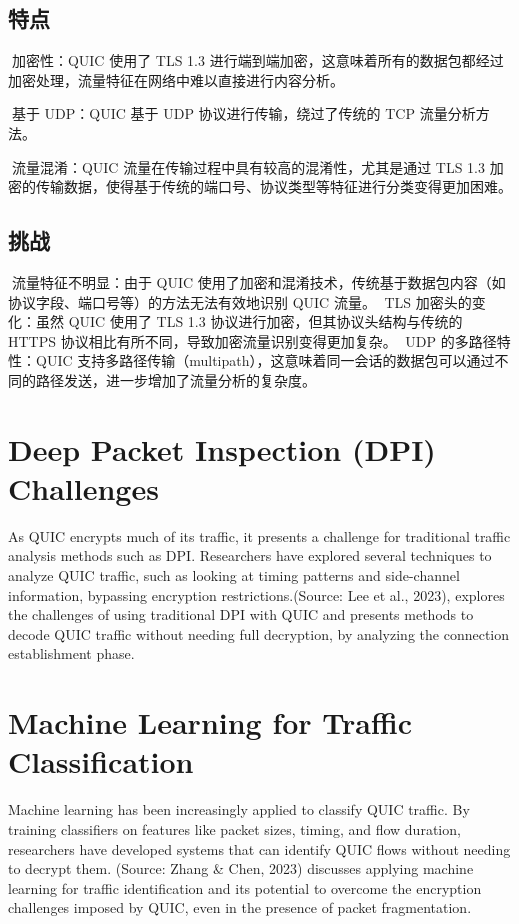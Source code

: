 \documentclass[a4paper, 10pt]{article}
\begin{document}
\subsection{特点}

加密性：QUIC 使用了 TLS 1.3 进行端到端加密，这意味着所有的数据包都经过加密处理，流量特征在网络中难以直接进行内容分析。

基于 UDP：QUIC 基于 UDP 协议进行传输，绕过了传统的 TCP 流量分析方法。

流量混淆：QUIC 流量在传输过程中具有较高的混淆性，尤其是通过 TLS 1.3 加密的传输数据，使得基于传统的端口号、协议类型等特征进行分类变得更加困难。

\subsection{挑战}

流量特征不明显：由于 QUIC 使用了加密和混淆技术，传统基于数据包内容（如协议字段、端口号等）的方法无法有效地识别 QUIC 流量。
TLS 加密头的变化：虽然 QUIC 使用了 TLS 1.3 协议进行加密，但其协议头结构与传统的 HTTPS 协议相比有所不同，导致加密流量识别变得更加复杂。
UDP 的多路径特性：QUIC 支持多路径传输（multipath），这意味着同一会话的数据包可以通过不同的路径发送，进一步增加了流量分析的复杂度。








\section{Deep Packet Inspection (DPI) Challenges}

As QUIC encrypts much of its traffic, it presents a challenge for traditional traffic analysis methods such as DPI. Researchers have explored several techniques to analyze QUIC traffic, such as looking at timing patterns and side-channel information, bypassing encryption restrictions.(Source: Lee et al., 2023), explores the challenges of using traditional DPI with QUIC and presents methods to decode QUIC traffic without needing full decryption, by analyzing the connection establishment phase.
\section{Machine Learning for Traffic Classification}

Machine learning has been increasingly applied to classify QUIC traffic. By training classifiers on features like packet sizes, timing, and flow duration, researchers have developed systems that can identify QUIC flows without needing to decrypt them.
(Source: Zhang \& Chen, 2023) discusses applying machine learning for traffic identification and its potential to overcome the encryption challenges imposed by QUIC, even in the presence of packet fragmentation.
\end{document}
